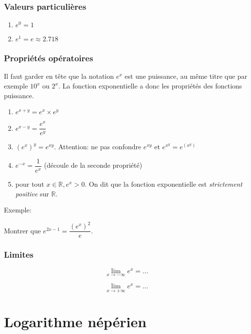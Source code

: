 \documentclass[a4paper,12pt]{scrartcl}
\begin{document}
\subsubsection{Valeurs particulières}

\begin{enumerate}
 \item $e^0 = 1$
 \item $e^1 = e \approx 2.718$ 
\end{enumerate}

\subsubsection{Propriétés opératoires}

Il faut garder en tête que la notation $e^x$ est une puissance, au même titre que par exemple $10^x$ ou $2^x$. La fonction exponentielle a donc les propriétés des fonctions puissance.

\begin{enumerate}
 \item $e^{x+y} = e^x \times e^y$
 \item $e^{x-y} = \dfrac{e^x}{e^y}$
 \item $\left(e^x \right)^y = e^{xy}$. Attention: ne pas confondre $e^{xy}$ et $e^{x^y} = e^{(x^y)}$
 \item $e^{-x} = \dfrac{1}{e^x}$ (découle de la seconde propriété)
 \item pour tout $x \in \mathbb{R}, e^x > 0$. On dit que la fonction exponentielle est \emph{strictement positive} sur $\mathbb{R}$.
\end{enumerate}

Exemple: 

Montrer que $e^{2x-1} = \dfrac{(e^x)^2}{e}$.


\subsubsection{Limites}

\begin{equation*}
 \lim_{x \rightarrow -\infty} e^x = \ldots
\end{equation*}

\begin{equation*}
 \lim_{x \rightarrow +\infty} e^x = \ldots
\end{equation*}

\section{Logarithme népérien}
\end{document}
